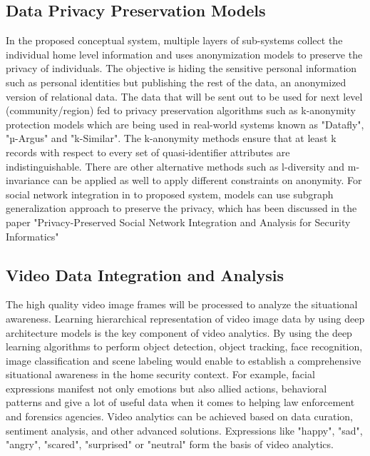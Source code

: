 \documentclass[sigconf]{acmart}
\begin{document}
\subsection{Data Privacy Preservation Models}
In the proposed conceptual system, multiple layers of sub-systems collect the individual home level information and uses anonymization models to preserve the privacy of individuals. The objective is hiding the sensitive personal information such as personal identities but publishing the rest of the data, an anonymized version of relational data. The data that will be sent out to be used for next level (community/region) fed to privacy preservation algorithms such as k-anonymity protection models which are being used in real-world systems known as "Datafly", "µ-Argus" and "k-Similar". The k-anonymity methods ensure that at least k records with respect to every set of quasi-identifier attributes are indistinguishable. There are other alternative methods such as l-diversity and m-invariance can be applied as well to apply different constraints on anonymity. For social network integration in to proposed system, models can use subgraph generalization approach to preserve the privacy, which has been discussed in the paper "Privacy-Preserved Social Network Integration and Analysis for Security Informatics"

\subsection{Video Data Integration and Analysis}
The high quality video image frames will be processed to analyze the situational awareness. Learning hierarchical representation of video image data by using deep architecture models is the key component of video analytics. By using the deep learning algorithms to perform object detection, object tracking, face recognition, image classification and scene labeling would enable to establish a comprehensive situational awareness in the home security context. For example, facial expressions manifest not only emotions but also allied actions, behavioral patterns and give a lot of useful data when it comes to helping law enforcement and forensics agencies. Video analytics can be achieved based on data curation, sentiment analysis, and other advanced solutions. Expressions like "happy", "sad", "angry", "scared", "surprised" or "neutral" form the basis of video analytics.
\end{document}
